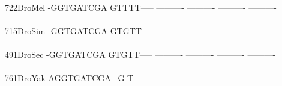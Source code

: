 \documentclass[11pt,twoside,reqno,a4paper]{article}
\begin{document}
{\\
722\hspace*{2\charwidth}DroMel	-GGTGATCGA	GTTTT-----	----------	----------	----------	----------	\\
\hspace*{5\charwidth}\hspace*{7\charwidth}\hspace*{1\charwidth}\hspace*{1\charwidth}\hspace*{1\charwidth}\hspace*{1\charwidth}\hspace*{1\charwidth}\hspace*{1\charwidth}\\
715\hspace*{2\charwidth}DroSim	-GGTGATCGA	GTGTT-----	----------	----------	----------	----------	\\
\hspace*{5\charwidth}\hspace*{7\charwidth}\hspace*{1\charwidth}\hspace*{1\charwidth}\hspace*{1\charwidth}\hspace*{1\charwidth}\hspace*{1\charwidth}\hspace*{1\charwidth}\\
491\hspace*{2\charwidth}DroSec	-GGTGATCGA	GTGTT-----	----------	----------	----------	----------	\\
\hspace*{5\charwidth}\hspace*{7\charwidth}\hspace*{1\charwidth}\hspace*{1\charwidth}\hspace*{1\charwidth}\hspace*{1\charwidth}\hspace*{1\charwidth}\hspace*{1\charwidth}\\
761\hspace*{2\charwidth}DroYak	AGGTGATCGA	--G-T-----	----------	----------	----------	----------	\\
\hspace*{5\charwidth}\hspace*{7\charwidth}\hspace*{1\charwidth}\hspace*{1\charwidth}\hspace*{1\charwidth}\hspace*{1\charwidth}\hspace*{1\charwidth}\hspace*{1\charwidth}\\
}
\end{document}
